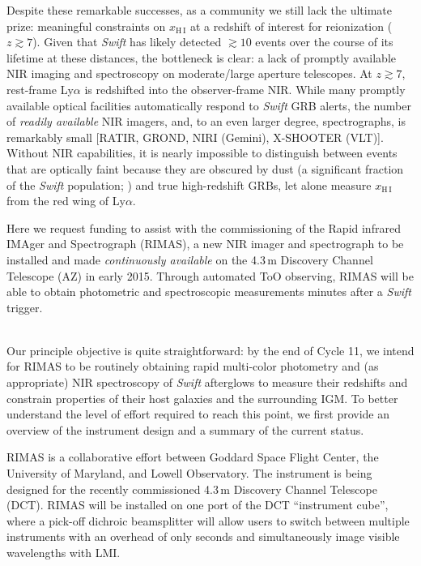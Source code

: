 \documentclass[letterpaper,11pt]{article}
\begin{document}
Despite these remarkable successes, as a community we still lack the ultimate
prize: meaningful constraints on $x_{\mathrm{H\,I}}$ at a redshift of interest
for reionization ($z \gtrsim 7$).  Given that \textit{Swift} has likely detected
$\gtrsim 10$ events over the course of its lifetime at these distances, the
bottleneck is clear: a lack of promptly available NIR imaging and spectroscopy 
on moderate/large aperture telescopes.  At $z \gtrsim 7$, rest-frame Ly$\alpha$
is redshifted into the observer-frame NIR.  While many promptly available 
optical facilities automatically respond to \textit{Swift} GRB alerts, the number
of \textit{readily available} NIR imagers, and, to an even larger degree,
spectrographs, is remarkably small [RATIR, GROND, NIRI (Gemini), X-SHOOTER (VLT)].
Without NIR capabilities, it is nearly impossible to distinguish between events
that are optically faint because they are obscured by dust (a significant fraction
of the \textit{Swift} population; \cite{ckh+09,pcb+09,gkk+11}) and true
high-redshift GRBs, let alone measure $x_{\mathrm{H\,I}}$ from the red wing of
Ly$\alpha$.

Here we request funding to assist with the commissioning of the Rapid infrared
IMAger and Spectrograph (RIMAS), a new NIR imager and spectrograph to be installed and made
\textit{continuously available} on the 4.3\,m Discovery Channel Telescope (AZ) in early 2015.
Through automated ToO observing, RIMAS will be able to obtain photometric and spectroscopic
measurements minutes after a \textit{Swift} trigger.\\

\smallskip

\smallskip\\
Our principle objective is quite straightforward: by the end of Cycle 11, we intend
for RIMAS to be routinely obtaining rapid multi-color photometry and (as appropriate) 
NIR spectroscopy of \textit{Swift} afterglows to measure their redshifts and constrain 
properties of their host galaxies and the surrounding IGM.  To better understand the 
level of effort required to reach this point, we first provide an overview of the 
instrument design and a summary of the current status.

\smallskip

RIMAS is a collaborative effort between Goddard Space Flight Center, the University of
Maryland, and Lowell Observatory.  The instrument is being designed for the recently
commissioned 4.3\,m Discovery Channel Telescope (DCT).  RIMAS will be installed on one 
port of the DCT ``instrument cube'', where a pick-off dichroic beamsplitter will allow users to
switch between multiple instruments with an overhead of only seconds and simultaneously
image visible wavelengths with LMI.
\end{document}
